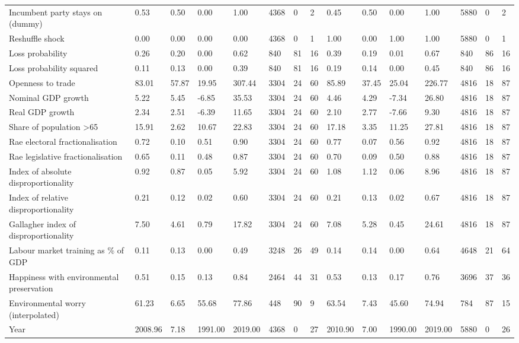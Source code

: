 \begin{longtable}{lllllllllllllll}
Incumbent party stays on (dummy) & 0.53 & 0.50 & 0.00 & 1.00 & 4368 & 0 & 2 & 0.45 & 0.50 & 0.00 & 1.00 & 5880 & 0 & 2\\
Reshuffle shock & 0.00 & 0.00 & 0.00 & 0.00 & 4368 & 0 & 1 & 1.00 & 0.00 & 1.00 & 1.00 & 5880 & 0 & 1\\
\addlinespace
Loss probability & 0.26 & 0.20 & 0.00 & 0.62 & 840 & 81 & 16 & 0.39 & 0.19 & 0.01 & 0.67 & 840 & 86 & 16\\
Loss probability squared & 0.11 & 0.13 & 0.00 & 0.39 & 840 & 81 & 16 & 0.19 & 0.14 & 0.00 & 0.45 & 840 & 86 & 16\\
Openness to trade & 83.01 & 57.87 & 19.95 & 307.44 & 3304 & 24 & 60 & 85.89 & 37.45 & 25.04 & 226.77 & 4816 & 18 & 87\\
Nominal GDP growth & 5.22 & 5.45 & -6.85 & 35.53 & 3304 & 24 & 60 & 4.46 & 4.29 & -7.34 & 26.80 & 4816 & 18 & 87\\
Real GDP growth & 2.34 & 2.51 & -6.39 & 11.65 & 3304 & 24 & 60 & 2.10 & 2.77 & -7.66 & 9.30 & 4816 & 18 & 87\\
\addlinespace
Share of population >65 & 15.91 & 2.62 & 10.67 & 22.83 & 3304 & 24 & 60 & 17.18 & 3.35 & 11.25 & 27.81 & 4816 & 18 & 87\\
Rae electoral fractionalisation & 0.72 & 0.10 & 0.51 & 0.90 & 3304 & 24 & 60 & 0.77 & 0.07 & 0.56 & 0.92 & 4816 & 18 & 87\\
Rae legislative fractionalisation & 0.65 & 0.11 & 0.48 & 0.87 & 3304 & 24 & 60 & 0.70 & 0.09 & 0.50 & 0.88 & 4816 & 18 & 87\\
Index of absolute disproportionality & 0.92 & 0.87 & 0.05 & 5.92 & 3304 & 24 & 60 & 1.08 & 1.12 & 0.06 & 8.96 & 4816 & 18 & 87\\
Index of relative disproportionality & 0.21 & 0.12 & 0.02 & 0.60 & 3304 & 24 & 60 & 0.21 & 0.13 & 0.02 & 0.67 & 4816 & 18 & 87\\
\addlinespace
Gallagher index of disproportionality & 7.50 & 4.61 & 0.79 & 17.82 & 3304 & 24 & 60 & 7.08 & 5.28 & 0.45 & 24.61 & 4816 & 18 & 87\\
Labour market training as \% of GDP & 0.11 & 0.13 & 0.00 & 0.49 & 3248 & 26 & 49 & 0.14 & 0.14 & 0.00 & 0.64 & 4648 & 21 & 64\\
Happiness with environmental preservation & 0.51 & 0.15 & 0.13 & 0.84 & 2464 & 44 & 31 & 0.53 & 0.13 & 0.17 & 0.76 & 3696 & 37 & 36\\
Environmental worry (interpolated) & 61.23 & 6.65 & 55.68 & 77.86 & 448 & 90 & 9 & 63.54 & 7.43 & 45.60 & 74.94 & 784 & 87 & 15\\
Year & 2008.96 & 7.18 & 1991.00 & 2019.00 & 4368 & 0 & 27 & 2010.90 & 7.00 & 1990.00 & 2019.00 & 5880 & 0 & 26\\
\bottomrule
\end{longtable}
